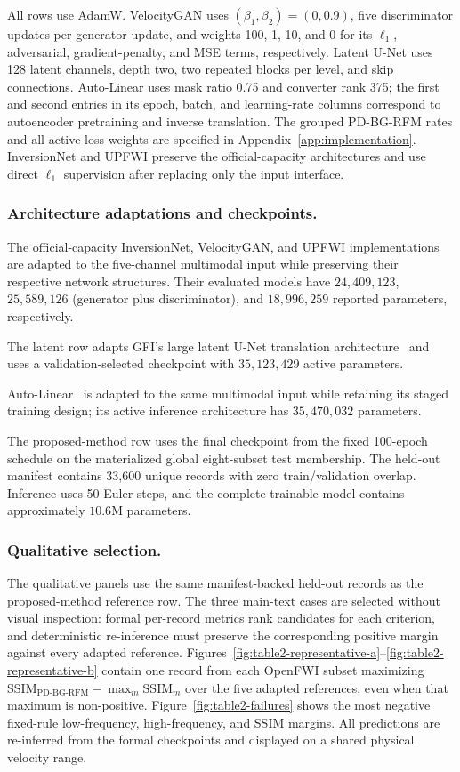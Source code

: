 \documentclass[letterpaper]{article}
\begin{document}
All rows use AdamW. VelocityGAN uses $(\beta_1,\beta_2)=(0,0.9)$, five discriminator updates per generator update, and weights 100, 1, 10, and 0 for its $\ell_1$, adversarial, gradient-penalty, and MSE terms, respectively. Latent U-Net uses 128 latent channels, depth two, two repeated blocks per level, and skip connections. Auto-Linear uses mask ratio 0.75 and converter rank 375; the first and second entries in its epoch, batch, and learning-rate columns correspond to autoencoder pretraining and inverse translation. The grouped PD-BG-RFM rates and all active loss weights are specified in Appendix~\ref{app:implementation}. InversionNet and UPFWI preserve the official-capacity architectures and use direct $\ell_1$ supervision after replacing only the input interface.

\subsubsection{Architecture adaptations and checkpoints.}
The official-capacity InversionNet, VelocityGAN, and UPFWI implementations are adapted to the five-channel multimodal input while preserving their respective network structures. Their evaluated models have $24{,}409{,}123$, $25{,}589{,}126$ (generator plus discriminator), and $18{,}996{,}259$ reported parameters, respectively.

The latent row adapts GFI's large latent U-Net translation architecture~\cite{gupta2025gfi} and uses a validation-selected checkpoint with $35{,}123{,}429$ active parameters.

Auto-Linear~\cite{feng2024autolinear} is adapted to the same multimodal input while retaining its staged training design; its active inference architecture has $35{,}470{,}032$ parameters.

The proposed-method row uses the final checkpoint from the fixed 100-epoch schedule on the materialized global eight-subset test membership. The held-out manifest contains 33,600 unique records with zero train/validation overlap. Inference uses 50 Euler steps, and the complete trainable model contains approximately $10.6$M parameters.

\subsubsection{Qualitative selection.}
The qualitative panels use the same manifest-backed held-out records as the proposed-method reference row. The three main-text cases are selected without visual inspection: formal per-record metrics rank candidates for each criterion, and deterministic re-inference must preserve the corresponding positive margin against every adapted reference. Figures~\ref{fig:table2-representative-a}--\ref{fig:table2-representative-b} contain one record from each OpenFWI subset maximizing $\mathrm{SSIM}_{\mathrm{PD\text{-}BG\text{-}RFM}}-\max_m\mathrm{SSIM}_m$ over the five adapted references, even when that maximum is non-positive. Figure~\ref{fig:table2-failures} shows the most negative fixed-rule low-frequency, high-frequency, and SSIM margins. All predictions are re-inferred from the formal checkpoints and displayed on a shared physical velocity range.

\fi
\end{document}
